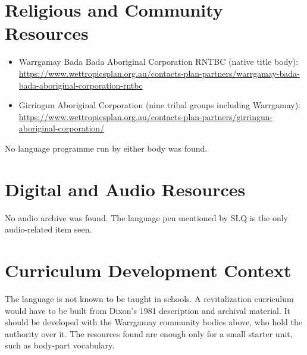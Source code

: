 \documentclass[12pt]{article}
\begin{document}
\section{Religious and Community Resources}
\begin{itemize}
\item Warrgamay Bada Bada Aboriginal Corporation RNTBC (native title body): \url{https://www.wettropicsplan.org.au/contacts-plan-partners/warrgamay-bada-bada-aboriginal-corporation-rntbc}
\item Girringun Aboriginal Corporation (nine tribal groups including Warrgamay): \url{https://www.wettropicsplan.org.au/contacts-plan-partners/girringun-aboriginal-corporation/}
\end{itemize}
No language programme run by either body was found.

\section{Digital and Audio Resources}
No audio archive was found. The language pen mentioned by SLQ is the only audio-related item seen.

\section{Curriculum Development Context}
The language is not known to be taught in schools. A revitalization curriculum would have to be built from Dixon's 1981 description and archival material. It should be developed with the Warrgamay community bodies above, who hold the authority over it. The resources found are enough only for a small starter unit, such as body-part vocabulary.
\end{document}
